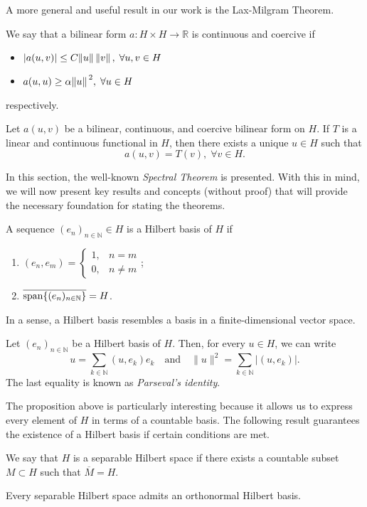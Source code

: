A more general and useful result in our work is the Lax-Milgram Theorem.
\begin{definition}
    We say that a bilinear form \(a: H \times H \rightarrow \mathbb{R}\) is continuous and coercive if
    \begin{itemize}
        \item \(\abs{a(u,v)} \leq C \norm*{u}\norm*{v}, \; \forall u, v \in H\)
        \item \(a(u,u) \geq \alpha \norm*{u}^2, \; \forall u \in H\)
    \end{itemize}
    respectively.
\end{definition}
\begin{theorem}\label{lax-milgram}
    Let \(a(u,v)\) be a bilinear, continuous, and coercive bilinear form on \(H\). If \(T\) is a linear and continuous functional in \(H\), then there exists a unique \(u \in H\) such that
    \[
        a(u, v) = T(v), \; \forall v \in H.
    \]
\end{theorem}
In this section, the well-known \textit{Spectral Theorem} is presented. With this in mind, we will now present key results and concepts (without proof) that will provide the necessary foundation for stating the theorems.
\begin{definition}
    A sequence \((e_n)_{n \in \mathbb{N}} \in H\) is a Hilbert basis of \(H\) if
    \begin{enumerate}
        \item \((e_n, e_m) = \begin{cases}
            1, & n=m\\
            0, & n \neq m
        \end{cases}\);
        \item \(\overline{\operatorname{span}\{(e_n)_{n \in \mathbb{N}}\}} = H\).
    \end{enumerate}
\end{definition}
In a sense, a Hilbert basis resembles a basis in a finite-dimensional vector space.
\begin{proposition}\label{hilb_basis}
    Let $(e_n)_{n \in \mathbb{N}}$ be a Hilbert basis of $H$. Then, for every $u \in H$, we can write
    \[
        u = \sum_{k \in \mathbb{N}} (u, e_k)e_k \quad \text{and} \quad \|u\|^2 = \sum_{k \in \mathbb{N}} |(u, e_k)|.
    \]
    The last equality is known as \textit{Parseval's identity}.
\end{proposition}
The proposition above is particularly interesting because it allows us to express every element of \(H\) in terms of a countable basis. The following result guarantees the existence of a Hilbert basis if certain conditions are met.
\begin{definition}
    We say that \(H\) is a separable Hilbert space if there exists a countable subset \(M \subset H\) such that \(\overline{M} = H\).
\end{definition}
\begin{theorem}
    Every separable Hilbert space admits an orthonormal Hilbert basis.
\end{theorem}

